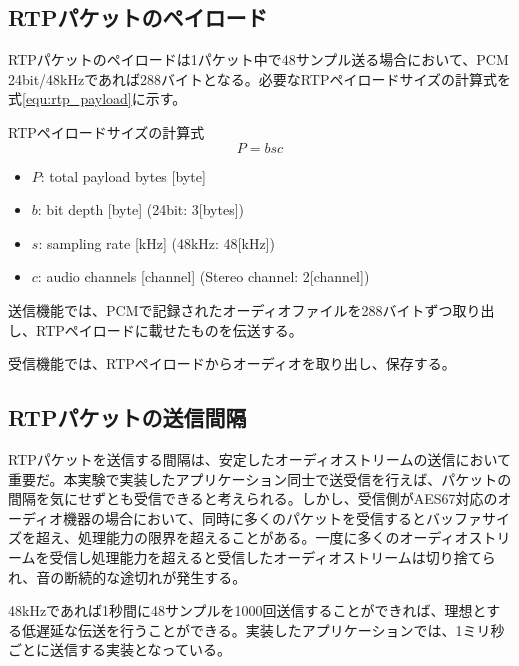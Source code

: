 \subsection{RTPパケットのペイロード}

RTPパケットのペイロードは1パケット中で48サンプル送る場合において、PCM 24bit/48kHzであれば288バイトとなる\cite{aes67-pcap}。必要なRTPペイロードサイズの計算式を式\ref{equ:rtp_payload}に示す。

\begin{itembox}[l]{RTPペイロードサイズの計算式}
  \begin{equation}
    \label{equ:rtp_payload}
    P = bsc
  \end{equation}
  \begin{itemize}
    \item $P$: total payload bytes [byte]
    \item $b$: bit depth [byte] (24bit: 3[bytes])
    \item $s$: sampling rate [kHz] (48kHz: 48[kHz])
    \item $c$: audio channels [channel] (Stereo channel: 2[channel])
  \end{itemize}
\end{itembox}

送信機能では、PCMで記録されたオーディオファイルを288バイトずつ取り出し、RTPペイロードに載せたものを伝送する。

受信機能では、RTPペイロードからオーディオを取り出し、保存する。

\subsection{RTPパケットの送信間隔}

RTPパケットを送信する間隔は、安定したオーディオストリームの送信において重要だ。本実験で実装したアプリケーション同士で送受信を行えば、パケットの間隔を気にせずとも受信できると考えられる。しかし、受信側がAES67対応のオーディオ機器の場合において、同時に多くのパケットを受信するとバッファサイズを超え、処理能力の限界を超えることがある。一度に多くのオーディオストリームを受信し処理能力を超えると受信したオーディオストリームは切り捨てられ、音の断続的な途切れが発生する。

48kHzであれば1秒間に48サンプルを1000回送信することができれば、理想とする低遅延な伝送を行うことができる。実装したアプリケーションでは、1ミリ秒ごとに送信する実装となっている。
